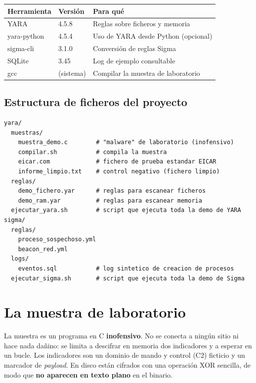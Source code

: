 \documentclass[11pt,a4paper]{article}
\begin{document}
\begin{center}
\begin{tabular}{@{}lll@{}}
\toprule
\textbf{Herramienta} & \textbf{Versión} & \textbf{Para qué} \\
\midrule
YARA        & 4.5.8   & Reglas sobre ficheros y memoria \\
yara-python & 4.5.4   & Uso de YARA desde Python (opcional) \\
sigma-cli   & 3.1.0   & Conversión de reglas Sigma \\
SQLite      & 3.45    & Log de ejemplo consultable \\
gcc         & (sistema) & Compilar la muestra de laboratorio \\
\bottomrule
\end{tabular}
\end{center}

\subsection*{Estructura de ficheros del proyecto}

\begin{lstlisting}[style=base]
yara/
  muestras/
    muestra_demo.c        # "malware" de laboratorio (inofensivo)
    compilar.sh           # compila la muestra
    eicar.com             # fichero de prueba estandar EICAR
    informe_limpio.txt    # control negativo (fichero limpio)
  reglas/
    demo_fichero.yar      # reglas para escanear ficheros
    demo_ram.yar          # reglas para escanear memoria
  ejecutar_yara.sh        # script que ejecuta toda la demo de YARA
sigma/
  reglas/
    proceso_sospechoso.yml
    beacon_red.yml
  logs/
    eventos.sql           # log sintetico de creacion de procesos
  ejecutar_sigma.sh       # script que ejecuta toda la demo de Sigma
\end{lstlisting}

\section{La muestra de laboratorio}

La muestra es un programa en C \textbf{inofensivo}. No se conecta a ningún sitio
ni hace nada dañino: se limita a descifrar en memoria dos indicadores y a esperar
en un bucle. Los indicadores son un dominio de mando y control (C2) ficticio y un
marcador de \emph{payload}. En disco están cifrados con una operación XOR sencilla,
de modo que \textbf{no aparecen en texto plano} en el binario.
\end{document}
